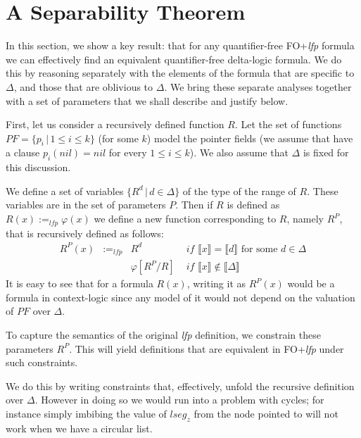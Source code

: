 	\section{A Separability Theorem}
In this section, we show a key result: that for any quantifier-free FO+\textit{lfp} formula we can effectively find an equivalent quantifier-free delta-logic formula. We do this by reasoning separately with the elements of the formula that are specific to $\Delta{}$, and those that are oblivious to $\Delta{}$. We bring these separate analyses together with a set of parameters that we shall describe and justify below.

First, let us consider a recursively defined function $R$. Let the set of functions $PF = \{ p_i \,|\, 1 \leq{} i \leq{} k \}$ (for some $k$) model the pointer fields (we assume that have a clause $p_i(nil) = nil$ for every $1 \leq{} i \leq{} k$). We also assume that $\Delta{}$ is fixed for this discussion.

We define a set of variables $\{R^{d}\,|\, d \in{} \Delta{} \}$ of the type of the range of $R$. These variables are in the set of parameters $P$. Then if $R$ is defined as $R(x) :=_\textit{lfp} \varphi{}(x)$ we define a new function corresponding to $R$, namely $R^{P}$, that is recursively defined as follows:
\begin{align}
R^{P}(x) & :=_\textit{lfp} & R^{d} & \textit{ if } \llbracket{}x\rrbracket{} = \llbracket{} d \rrbracket{} \textrm{ for some } d \in{}\Delta{}\tag{delta case}\\
& & \varphi{}[R^{P}/R] & \textit{ if } \llbracket{}x\rrbracket{} \notin{} \llbracket{}\Delta{}\rrbracket{} \tag{recursive case}
\end{align}  
It is easy to see that for a formula $R(x)$, writing it as $R^{P}(x)$ would be a formula in context-logic since any model of it would not depend on the valuation of $PF$ over $\Delta{}$.

To capture the semantics of the original \textit{lfp} definition, we constrain these parameters $R^{P}$. This will yield definitions that are equivalent in FO+\textit{lfp} under such constraints.

We do this by writing constraints that, effectively, unfold the recursive definition over $\Delta{}$. However in doing so we would run into a problem with cycles; for instance simply imbibing the value of $\textit{lseg}_{z}$ from the node pointed to will not work when we have a circular list.

